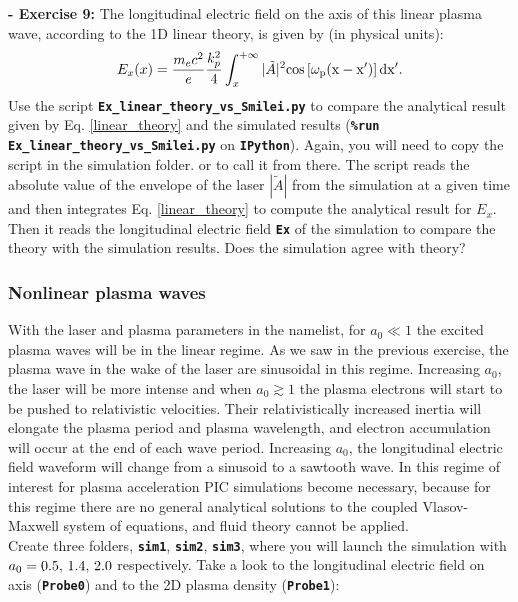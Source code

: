 \documentclass[a4paper,12pt]{extarticle}
\newcommand{\commandline}[1]{\texttt{\textbf{#1}}}
\begin{document}
\textbf{ - Exercise 9:} The longitudinal electric field on the axis of this linear plasma wave, according to the 1D linear theory, is given by (in physical units):
\begin{equation}\label{linear_theory}
E_x(x) = \frac{m_e c^2}{e}\frac{k_p^2}{4} \int_x^{+\infty} |\tilde{A}|^2\rm{cos}\left[\omega_p(x-x')\right]dx'.\\
\end{equation}
Use the script \commandline{Ex\_linear\_theory\_vs\_Smilei.py} to compare the analytical result given by Eq. \ref{linear_theory} and the simulated results (\commandline{\%run Ex\_linear\_theory\_vs\_Smilei.py} on \commandline{IPython}). Again, you will need to copy the script in the simulation folder. or to call it from there. The script reads the absolute value of the envelope of the laser $|\tilde{A}|$ from the simulation at a given time and then integrates Eq. \ref{linear_theory} to compute the analytical result for $E_x$. Then it reads the longitudinal electric field \commandline{Ex} of the simulation to compare the theory with the simulation results. Does the simulation agree with theory?

\subsubsection {Nonlinear plasma waves}
With the laser and plasma parameters in the namelist, for $a_0\ll1$ the excited plasma waves will be in the linear regime. As we saw in the previous exercise, the plasma wave in the wake of  the laser are sinusoidal in this regime.
Increasing $a_0$, the laser will be more intense and when $a_0\gtrsim1$ the plasma electrons will start to  be pushed to relativistic velocities. Their relativistically increased inertia will elongate the plasma period and plasma wavelength, and electron accumulation will occur at the end of each wave period. Increasing $a_0$, the longitudinal electric field waveform will change from a sinusoid to a sawtooth wave. In this regime of interest for plasma acceleration PIC simulations become necessary, because for this regime there are no general analytical solutions to the coupled Vlasov-Maxwell system of equations,  and fluid theory cannot be applied.\\

Create three folders, \commandline{sim1}, \commandline{sim2}, \commandline{sim3}, where you will launch the simulation  with $a_0=0.5,\thinspace 1.4,\thinspace 2.0$ respectively. Take a look to the longitudinal electric field on axis (\commandline{Probe0}) and to the 2D plasma density (\commandline{Probe1}):\\
\end{document}
